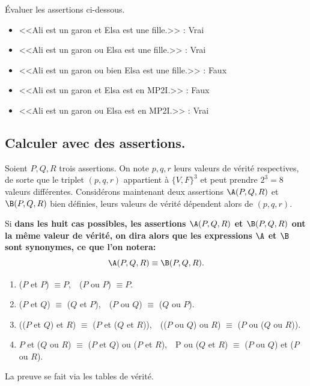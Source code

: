 \documentclass[11pt]{article}
\begin{document}
\begin{ex}{}{}
    Évaluer les assertions ci-dessous.
    \begin{itemize}
        \item <<Ali est un garon et Elsa est une fille.>> : Vrai
        \item <<Ali est un garon ou Elsa est une fille.>> : Vrai
        \item <<Ali est un garon ou bien Elsa est une fille.>> : Faux
        \item <<Ali est un garon et Elsa est en MP2I.>> : Faux
        \item <<Ali est un garon ou Elsa est en MP2I.>> : Vrai
    \end{itemize}
\end{ex}



\subsection{Calculer avec des assertions.}

Soient $P,Q,R$ trois assertions. On note $p,q,r$ leurs valeurs de vérité respectives, de sorte que le triplet $(p,q,r)$ appartient à $\{V,F\}^3$ et peut prendre $2^3=8$ valeurs différentes.\n
Considérons maintenant deux assertions $\A(P,Q,R)$ et $\B(P,Q,R)$ bien définies, leurs valeurs de vérité dépendent alors de $(p,q,r)$.
\vspace*{0.3cm}

\begin{nota}{}{}
    Si \bf{dans les huit cas possibles}, les assertions $\A(P,Q,R)$ et $\B(P,Q,R)$ ont la même valeur de vérité, on dira alors que les expressions $\A$ et $\B$ sont \bf{synonymes}, ce que l'on notera:
    \begin{equation*}
        \A(P,Q,R)\equiv\B(P,Q,R).
    \end{equation*} 
\end{nota}

\begin{prop}{}{}
    \begin{enumerate}
        \item ($P$ et $P$) $\equiv P$,$\quad$($P$ ou $P$) $\equiv P$.
        \item ($P$ et $Q$) $\equiv$ ($Q$ et $P$),$\quad$($P$ ou $Q$) $\equiv$ ($Q$ ou $P$).
        \item (($P$ et $Q$) et $R$) $\equiv$ ($P$ et ($Q$ et $R$)),$\quad$(($P$ ou $Q$) ou $R$) $\equiv$ ($P$ ou ($Q$ ou $R$)).
        \item $P$ et ($Q$ ou $R$) $\equiv$ ($P$ et $Q$) ou ($P$ et $R$),$\quad$P ou ($Q$ et $R$) $\equiv$ ($P$ ou $Q$) et ($P$ ou $R$).
    \end{enumerate}
    \tcblower
    La preuve se fait via les tables de vérité.
\end{prop}
\end{document}
